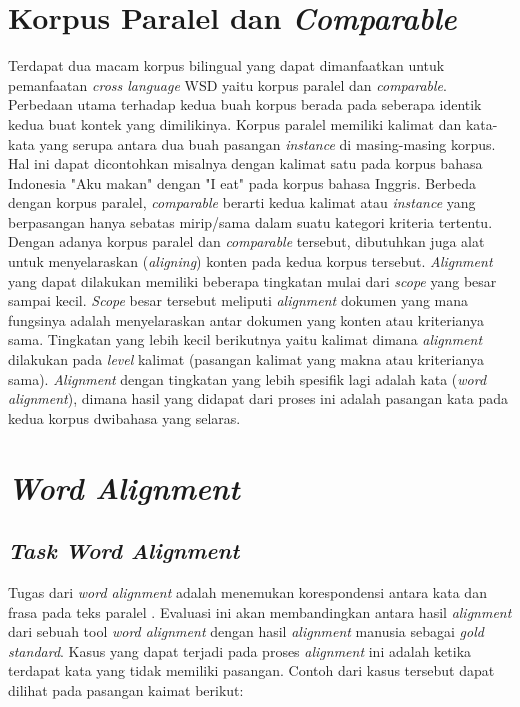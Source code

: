 \section{Korpus Paralel dan \textit{Comparable}}
Terdapat dua macam korpus bilingual yang dapat dimanfaatkan untuk pemanfaatan \textit{cross language } WSD yaitu korpus paralel dan \textit{comparable}. Perbedaan utama terhadap kedua buah korpus berada pada seberapa identik kedua buat kontek yang dimilikinya. Korpus paralel memiliki kalimat dan kata-kata yang serupa antara dua buah pasangan \textit{instance} di masing-masing korpus. Hal ini dapat dicontohkan misalnya dengan kalimat satu pada korpus bahasa Indonesia "Aku makan" dengan "I eat" pada korpus bahasa Inggris. Berbeda dengan korpus paralel, \textit{comparable} berarti kedua kalimat atau \textit{instance} yang berpasangan hanya sebatas mirip/sama dalam suatu kategori kriteria tertentu. Dengan adanya korpus paralel dan \textit{comparable} tersebut, dibutuhkan juga alat untuk menyelaraskan (\textit{aligning}) konten pada kedua korpus tersebut. \textit{Alignment} yang dapat dilakukan memiliki beberapa tingkatan mulai dari \textit{scope} yang besar sampai kecil. \textit{Scope} besar tersebut meliputi \textit{alignment} dokumen yang mana fungsinya adalah menyelaraskan antar dokumen yang konten atau kriterianya sama. Tingkatan yang lebih kecil berikutnya yaitu kalimat dimana \textit{alignment} dilakukan pada \textit{level} kalimat (pasangan kalimat yang makna atau kriterianya sama). \textit{Alignment} dengan tingkatan yang lebih spesifik lagi adalah kata (\textit{word alignment}), dimana hasil yang didapat dari proses ini adalah pasangan kata pada kedua korpus dwibahasa yang selaras.
\section{\textit{Word Alignment}}

\subsection{\textit{Task Word Alignment}}
Tugas dari \textit{word alignment} adalah menemukan korespondensi antara kata dan frasa pada teks paralel 
\citep{mihalcea2003evaluation}. Evaluasi ini akan membandingkan antara hasil \textit{alignment} dari sebuah tool \textit{word alignment} dengan hasil \textit{alignment} manusia sebagai \textit{gold standard}. Kasus yang dapat terjadi pada proses \textit{alignment} ini adalah ketika terdapat kata yang tidak memiliki pasangan. Contoh dari kasus tersebut dapat dilihat pada pasangan kaimat berikut:


